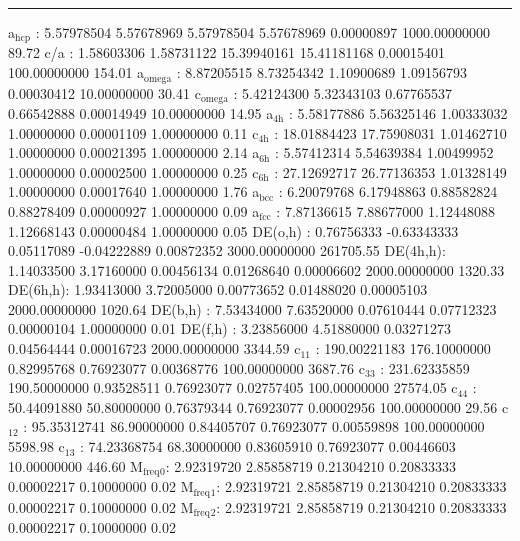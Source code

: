 \documentclass[11pt]{article}
\begin{document}
\noindent\rule{\textwidth}{0.5pt}
a\(_{\text{hcp}}\)   :   5.57978504   5.57678969   5.57978504   5.57678969   0.00000897 1000.00000000        89.72
c/a     :   1.58603306   1.58731122  15.39940161  15.41181168   0.00015401 100.00000000       154.01
a\(_{\text{omega}}\) :   8.87205515   8.73254342   1.10900689   1.09156793   0.00030412  10.00000000        30.41
c\(_{\text{omega}}\) :   5.42124300   5.32343103   0.67765537   0.66542888   0.00014949  10.00000000        14.95
a\(_{\text{4h}}\)    :   5.58177886   5.56325146   1.00333032   1.00000000   0.00001109   1.00000000         0.11
c\(_{\text{4h}}\)    :  18.01884423  17.75908031   1.01462710   1.00000000   0.00021395   1.00000000         2.14
a\(_{\text{6h}}\)    :   5.57412314   5.54639384   1.00499952   1.00000000   0.00002500   1.00000000         0.25
c\(_{\text{6h}}\)    :  27.12692717  26.77136353   1.01328149   1.00000000   0.00017640   1.00000000         1.76
a\(_{\text{bcc}}\)   :   6.20079768   6.17948863   0.88582824   0.88278409   0.00000927   1.00000000         0.09
a\(_{\text{fcc}}\)   :   7.87136615   7.88677000   1.12448088   1.12668143   0.00000484   1.00000000         0.05
DE(o,h) :   0.76756333  -0.63343333   0.05117089  -0.04222889   0.00872352 3000.00000000    261705.55
DE(4h,h):   1.14033500   3.17160000   0.00456134   0.01268640   0.00006602 2000.00000000      1320.33
DE(6h,h):   1.93413000   3.72005000   0.00773652   0.01488020   0.00005103 2000.00000000      1020.64
DE(b,h) :   7.53434000   7.63520000   0.07610444   0.07712323   0.00000104   1.00000000         0.01
DE(f,h) :   3.23856000   4.51880000   0.03271273   0.04564444   0.00016723 2000.00000000      3344.59
c\(_{\text{11}}\)    : 190.00221183 176.10000000   0.82995768   0.76923077   0.00368776 100.00000000      3687.76
c\(_{\text{33}}\)    : 231.62335859 190.50000000   0.93528511   0.76923077   0.02757405 100.00000000     27574.05
c\(_{\text{44}}\)    :  50.44091880  50.80000000   0.76379344   0.76923077   0.00002956 100.00000000        29.56
c\(_{\text{12}}\)    :  95.35312741  86.90000000   0.84405707   0.76923077   0.00559898 100.00000000      5598.98
c\(_{\text{13}}\)    :  74.23368754  68.30000000   0.83605910   0.76923077   0.00446603  10.00000000       446.60
M\(_{\text{freq}}\)\(_{\text{0}}\):   2.92319720   2.85858719   0.21304210   0.20833333   0.00002217   0.10000000         0.02
M\(_{\text{freq}}\)\(_{\text{1}}\):   2.92319721   2.85858719   0.21304210   0.20833333   0.00002217   0.10000000         0.02
M\(_{\text{freq}}\)\(_{\text{2}}\):   2.92319721   2.85858719   0.21304210   0.20833333   0.00002217   0.10000000         0.02
\end{document}
